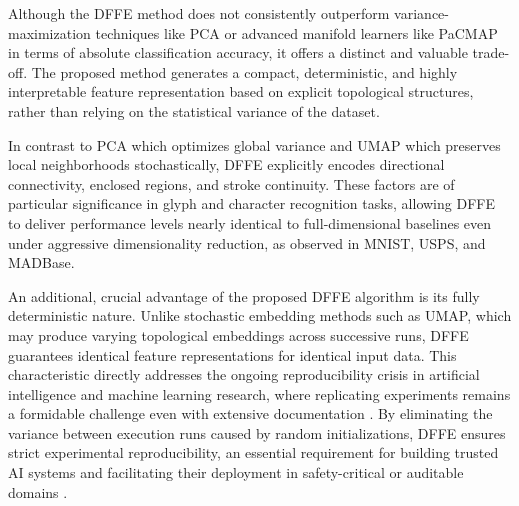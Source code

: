 \documentclass[a4paper,fleqn]{cas-dc}
\begin{document}
Although the DFFE method does not consistently outperform variance-maximization techniques like PCA or advanced manifold learners like PaCMAP in terms of absolute classification accuracy, it offers a distinct and valuable trade-off. The proposed method generates a compact, deterministic, and highly interpretable feature representation based on explicit topological structures, rather than relying on the statistical variance of the dataset.

In contrast to PCA which optimizes global variance and UMAP which preserves local neighborhoods stochastically, DFFE explicitly encodes directional connectivity, enclosed regions, and stroke continuity. These factors are of particular significance in glyph and character recognition tasks, allowing DFFE to deliver performance levels nearly identical to full-dimensional baselines even under aggressive dimensionality reduction, as observed in MNIST, USPS, and MADBase.

An additional, crucial advantage of the proposed DFFE algorithm is its fully deterministic nature. Unlike stochastic embedding methods such as UMAP, which may produce varying topological embeddings across successive runs, DFFE guarantees identical feature representations for identical input data. This characteristic directly addresses the ongoing reproducibility crisis in artificial intelligence and machine learning research, where replicating experiments remains a formidable challenge even with extensive documentation \cite{desai2025}. By eliminating the variance between execution runs caused by random initializations, DFFE ensures strict experimental reproducibility, an essential requirement for building trusted AI systems and facilitating their deployment in safety-critical or auditable domains \cite{semmelrock2025}.
\end{document}
